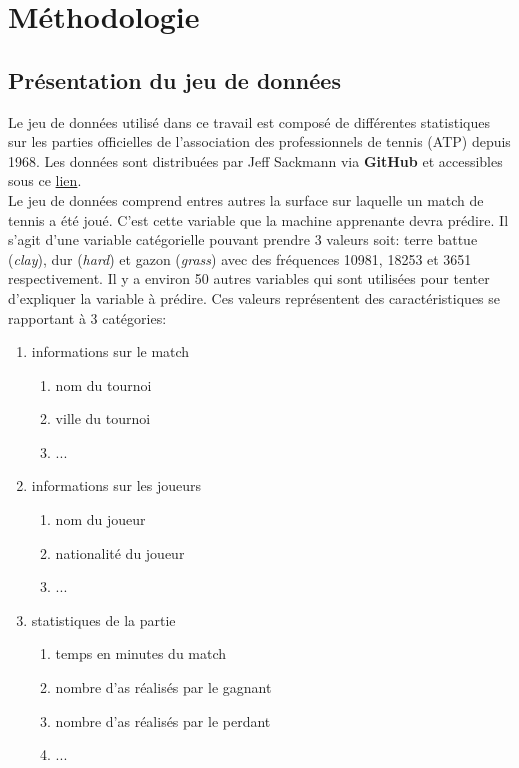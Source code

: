 \section{Méthodologie}

\subsection{Présentation du jeu de données}
Le jeu de données utilisé dans ce travail est composé de différentes statistiques sur les parties officielles de l'association des professionnels de tennis (ATP) depuis 1968. Les données sont distribuées par Jeff Sackmann via \textbf{GitHub} et accessibles sous ce \href{https://github.com/JeffSackmann/tennis_atp}{lien}.\\

Le jeu de données comprend entres autres la surface sur laquelle un match de tennis a été joué. C'est cette variable que la machine apprenante devra prédire. Il s'agit d'une variable catégorielle pouvant prendre 3 valeurs soit: terre battue (\textit{clay}), dur (\textit{hard}) et gazon (\textit{grass}) avec des fréquences 10981, 18253 et 3651 respectivement. Il y a environ 50 autres variables qui sont utilisées pour tenter d'expliquer la variable à prédire. Ces valeurs représentent des caractéristiques se rapportant à 3 catégories:

\begin{enumerate}
  \item informations sur le match
    \begin{enumerate}
      \item nom du tournoi
      \item ville du tournoi
      \item ...
    \end{enumerate}
  \item informations sur les joueurs
    \begin{enumerate}
      \item nom du joueur
      \item nationalité du joueur
      \item ...
    \end{enumerate}
  \item statistiques de la partie
    \begin{enumerate}
      \item temps en minutes du match
      \item nombre d'as réalisés par le gagnant
      \item nombre d'as réalisés par le perdant
      \item ...
    \end{enumerate}
\end{enumerate}

